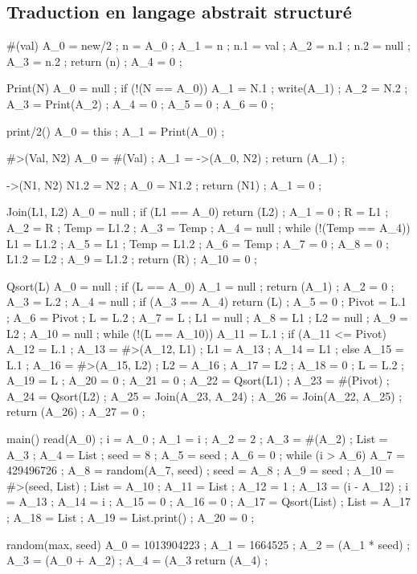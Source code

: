 \subsection{Traduction en langage abstrait structuré}
{\small \begin{verbatimtab}
#(val)
{
  A_0 = new/2 ;
  n = A_0 ;
  A_1 = n ;
  n.1 = val ;
  A_2 = n.1 ;
  n.2 = null ;
  A_3 = n.2 ;
  return (n) ;
  A_4 = 0 ;
}

Print(N)
{
  A_0 = null ;
  if (!(N == A_0))
    {
      A_1 = N.1 ;
      write(A_1) ;
      A_2 = N.2 ;
      A_3 = Print(A_2) ;
      A_4 = 0 ;
    }
  A_5 = 0 ;
  A_6 = 0 ;
}

print/2()
{
  A_0 = this ;
  A_1 = Print(A_0) ;
}

#>(Val, N2)
{
  A_0 = #(Val) ;
  A_1 = ->(A_0, N2) ;
  return (A_1) ;
}

->(N1, N2)
{
  N1.2 = N2 ;
  A_0 = N1.2 ;
  return (N1) ;
  A_1 = 0 ;
}

Join(L1, L2)
{
  A_0 = null ;
  if (L1 == A_0)
    {
      return (L2) ;
    }
  A_1 = 0 ;
  R = L1 ;
  A_2 = R ;
  Temp = L1.2 ;
  A_3 = Temp ;
  A_4 = null ;
  while (!(Temp == A_4))
    {
      L1 = L1.2 ;
      A_5 = L1 ;
      Temp = L1.2 ;
      A_6 = Temp ;
      A_7 = 0 ;
    }
  A_8 = 0 ;
  L1.2 = L2 ;
  A_9 = L1.2 ;
  return (R) ;
  A_10 = 0 ;
}

Qsort(L)
{
  A_0 = null ;
  if (L == A_0)
    {
      A_1 = null ;
      return (A_1) ;
    }
  A_2 = 0 ;
  A_3 = L.2 ;
  A_4 = null ;
  if (A_3 == A_4)
    {
      return (L) ;
    }
  A_5 = 0 ;
  Pivot = L.1 ;
  A_6 = Pivot ;
  L = L.2 ;
  A_7 = L ;
  L1 = null ;
  A_8 = L1 ;
  L2 = null ;
  A_9 = L2 ;
  A_10 = null ;
  while (!(L == A_10))
    {
      A_11 = L.1 ;
      if (A_11 <= Pivot)
        {
          A_12 = L.1 ;
          A_13 = #>(A_12, L1) ;
          L1 = A_13 ;
          A_14 = L1 ;
        }
      else
        {
          A_15 = L.1 ;
          A_16 = #>(A_15, L2) ;
          L2 = A_16 ;
          A_17 = L2 ;
        }
      A_18 = 0 ;
      L = L.2 ;
      A_19 = L ;
      A_20 = 0 ;
    }
  A_21 = 0 ;
  A_22 = Qsort(L1) ;
  A_23 = #(Pivot) ;
  A_24 = Qsort(L2) ;
  A_25 = Join(A_23, A_24) ;
  A_26 = Join(A_22, A_25) ;
  return (A_26) ;
  A_27 = 0 ;
}

main()
{
  read(A_0) ;
  i = A_0 ;
  A_1 = i ;
  A_2 = 2 ;
  A_3 = #(A_2) ;
  List = A_3 ;
  A_4 = List ;
  seed = 8 ;
  A_5 = seed ;
  A_6 = 0 ;
  while (i > A_6)
    {
      A_7 = 429496726 ;
      A_8 = random(A_7, seed) ;
      seed = A_8 ;
      A_9 = seed ;
      A_10 = #>(seed, List) ;
      List = A_10 ;
      A_11 = List ;
      A_12 = 1 ;
      A_13 = (i - A_12) ;
      i = A_13 ;
      A_14 = i ;
      A_15 = 0 ;
    }
  A_16 = 0 ;
  A_17 = Qsort(List) ;
  List = A_17 ;
  A_18 = List ;
  A_19 = List.print() ;
  A_20 = 0 ;
}

random(max, seed)
{
  A_0 = 1013904223 ;
  A_1 = 1664525 ;
  A_2 = (A_1 * seed) ;
  A_3 = (A_0 + A_2) ;
  A_4 = (A_3 %
  return (A_4) ;
}
\end{verbatimtab}}
